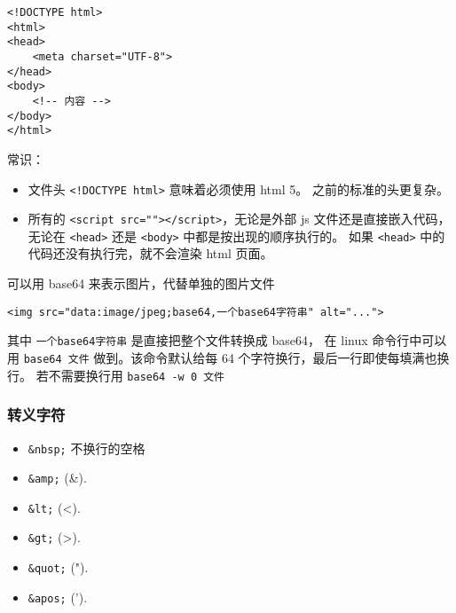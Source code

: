 
\begin{issues}
\issueDraft
\end{issues}

\begin{lstlisting}[language=none]
<!DOCTYPE html>
<html>
<head>
    <meta charset="UTF-8">
</head>
<body>
    <!-- 内容 -->
</body>
</html>
\end{lstlisting}

常识：
\begin{itemize}
\item 文件头 \verb`<!DOCTYPE html>` 意味着必须使用 html 5。 之前的标准的头更复杂。
\item 所有的 \verb`<script src=""></script>`，无论是外部 js 文件还是直接嵌入代码，无论在 \verb`<head>` 还是 \verb`<body>` 中都是按出现的顺序执行的。 如果 \verb`<head>` 中的代码还没有执行完，就不会渲染 html 页面。
\end{itemize}

可以用 base64 来表示图片，代替单独的图片文件
\begin{lstlisting}[language=none]
<img src="data:image/jpeg;base64,一个base64字符串" alt="...">
\end{lstlisting}
其中 \verb|一个base64字符串| 是直接把整个文件转换成 base64， 在 linux 命令行中可以用 \verb|base64 文件| 做到。该命令默认给每 64 个字符换行，最后一行即使每填满也换行。 若不需要换行用 \verb|base64 -w 0 文件|

\subsubsection{转义字符}
\begin{itemize}
\item \verb`&nbsp;` 不换行的空格
\item \verb`&amp;` (&).
\item \verb`&lt;` (<).
\item \verb`&gt;` (>).
\item \verb`&quot;` (").
\item \verb`&apos;` (').
\end{itemize}
